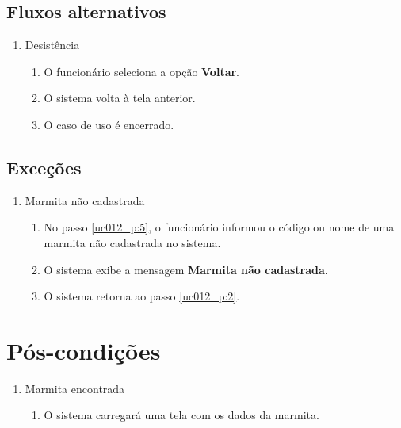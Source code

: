 \subsection{Fluxos alternativos}

\begin{enumerate}[label=A\arabic*]
	\item Desistência
	\begin{enumerate}[label*=.\arabic*]
		\item O funcionário seleciona a opção \textbf{Voltar}.
		\item O sistema volta à tela anterior.
		\item O caso de uso é encerrado.		
	\end{enumerate}	
\end{enumerate}

\subsection{Exceções}

\begin{enumerate}[label=E\arabic*]
	\item Marmita não cadastrada \label{uc012_e:1}
	\begin{enumerate}[label*=.\arabic*]
		\item[] No passo \ref{uc012_p:5}, o funcionário informou o código ou nome de uma marmita não cadastrada no sistema.
		\item O sistema exibe a mensagem \textbf{Marmita não cadastrada}.
		\item O sistema retorna ao passo \ref{uc012_p:2}.
	\end{enumerate}
\end{enumerate}

\section{Pós-condições}

\begin{enumerate}
	\item Marmita encontrada
	\begin{enumerate}
		\item O sistema carregará uma tela com os dados da marmita.
	\end{enumerate}
\end{enumerate}